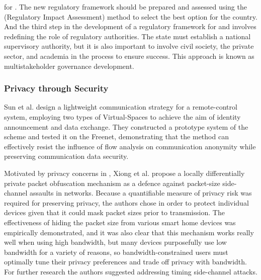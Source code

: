 for \hyperlink{\acronym}{\acronym}. The new regulatory framework should be prepared and assessed using the
\hyperlink{\acronym}{\acronym} (Regulatory Impact Assessment) method to select the best option for the country. And the
third step in the development of a regulatory framework for \hyperlink{\acronym}{\acronym} and \hyperlink{\acronym}{\acronym} involves
redefining the role of regulatory authorities. The state must establish a national
supervisory authority, but it is also important to involve civil society, the private
sector, and academia in the process to ensure success. This approach is known as
multistakeholder governance development.

\subsubsection{Privacy through Security}\label{subsubsection:privacy_through_security}

Sun et al. \cite{SunSecure} design a lightweight communication strategy
for a remote-control system, employing two types of Virtual-Spaces to achieve
the aim of identity announcement and data exchange. They constructed a prototype
system of the scheme and tested it on the Freenet, demonstrating that the
method can effectively resist the influence of flow analysis on communication
anonymity while preserving communication data security.

Motivated by privacy concerns in \hyperlink{\acronym}{\acronym}, Xiong et al. \cite{xiong2018defending}
propose a locally differentially private packet obfuscation mechanism as
a defence against packet-size side-channel assaults in \hyperlink{\acronym}{\acronym} networks. Because
a quantifiable measure of privacy risk was required for preserving privacy,
the authors chose \hyperlink{\acronym}{\acronym} in order to protect individual
\hyperlink{\acronym}{\acronym} devices given that it could mask packet sizes prior to transmission.
The effectiveness of hiding the packet size from various smart home \hyperlink{\acronym}{\acronym}
devices was empirically demonstrated, and it was also clear that this mechanism
works really well when using high bandwidth, but many \hyperlink{\acronym}{\acronym} devices purposefully
use low bandwidth for a variety of reasons, so bandwidth-constrained users
must optimally tune their privacy preferences and trade off privacy with
bandwidth. For further research the authors suggested addressing timing side-channel
attacks.

